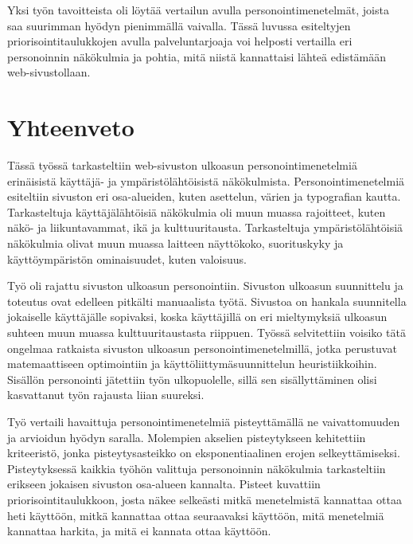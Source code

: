 \documentclass[finnish, 12pt, a4paper, elec, utf8, a-1b, online]{aaltothesis}
\begin{document}
Yksi työn tavoitteista oli löytää vertailun avulla personointimenetelmät, joista
saa suurimman hyödyn pienimmällä vaivalla. Tässä luvussa esiteltyjen
priorisointitaulukkojen avulla palveluntarjoaja voi helposti vertailla eri
personoinnin näkökulmia ja pohtia, mitä niistä kannattaisi lähteä edistämään
web-sivustollaan.

\clearpage
\section{Yhteenveto}

Tässä työssä tarkasteltiin web-sivuston ulkoasun personointimenetelmiä
erinäisistä käyttäjä- ja ympäristölähtöisistä näkökulmista.
Personointimenetelmiä esiteltiin sivuston eri osa-alueiden, kuten asettelun,
värien ja typografian kautta. Tarkasteltuja käyttäjälähtöisiä näkökulmia oli
muun muassa rajoitteet, kuten näkö- ja liikuntavammat, ikä ja kulttuuritausta.
Tarkasteltuja ympäristölähtöisiä näkökulmia olivat muun muassa laitteen
näyttökoko, suorituskyky ja käyttöympäristön ominaisuudet, kuten valoisuus.

Työ oli rajattu sivuston ulkoasun personointiin. Sivuston ulkoasun suunnittelu
ja toteutus ovat edelleen pitkälti manuaalista työtä. Sivustoa on hankala
suunnitella jokaiselle käyttäjälle sopivaksi, koska käyttäjillä on eri
mieltymyksiä ulkoasun suhteen muun muassa kulttuuritaustasta riippuen. Työssä
selvitettiin voisiko tätä ongelmaa ratkaista sivuston ulkoasun
personointimenetelmillä, jotka perustuvat matemaattiseen optimointiin ja
käyttöliittymäsuunnittelun heuristiikkoihin. Sisällön personointi jätettiin työn
ulkopuolelle, sillä sen sisällyttäminen olisi kasvattanut työn rajausta liian
suureksi.

Työ vertaili havaittuja personointimenetelmiä pisteyttämällä ne vaivattomuuden
ja arvioidun hyödyn saralla. Molempien akselien pisteytykseen kehitettiin
kriteeristö, jonka pisteytysasteikko on eksponentiaalinen erojen
selkeyttämiseksi. Pisteytyksessä kaikkia työhön valittuja personoinnin
näkökulmia tarkasteltiin erikseen jokaisen sivuston osa-alueen kannalta. Pisteet
kuvattiin priorisointitaulukkoon, josta näkee selkeästi mitkä menetelmistä
kannattaa ottaa heti käyttöön, mitkä kannattaa ottaa seuraavaksi käyttöön, mitä
menetelmiä kannattaa harkita, ja mitä ei kannata ottaa käyttöön.
\end{document}
